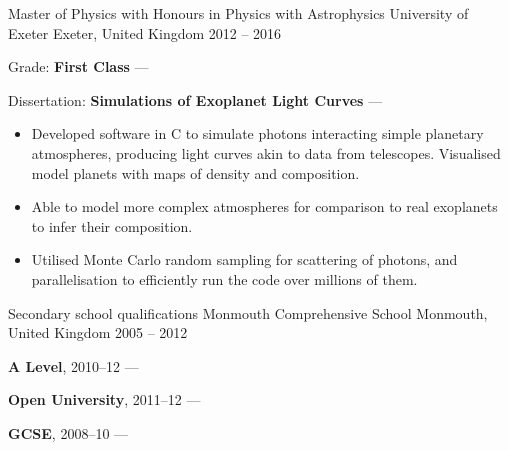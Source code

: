 \begin{cventries}
    \cventry
        {Master of Physics with Honours in Physics with Astrophysics}
        {University of Exeter}
        {Exeter, United Kingdom}
        {2012 -- 2016}
        {
        \begin{cvitems} %
            \item {Grade: \textbf{First Class} --- }
            \item {Dissertation: \textbf{Simulations of Exoplanet Light Curves} --- }
            \vpaddingEduSubpoint
            \begin{itemize}[itemsep=\vPaddingLength, label=\bullet]
                \item{Developed software in C to simulate photons interacting simple planetary atmospheres, producing light curves akin to data from telescopes. Visualised model planets with maps of density and composition.}
                \item{Able to model more complex atmospheres for comparison to real exoplanets to infer their composition.}
                \item{Utilised Monte Carlo random sampling for scattering of photons, and parallelisation to efficiently run the code over millions of them.}
            \end{itemize}
        \end{cvitems}
        } %

    \cventry
        {Secondary school qualifications}
        {Monmouth Comprehensive School}
        {Monmouth, United Kingdom}
        {2005 -- 2012}
        {
        \begin{cvitems}
            \item {\textbf{A Level}, 2010--12 --- }
            \item {\textbf{Open University}, 2011--12 --- }
            \item {\textbf{GCSE}, 2008--10 --- }
        \end{cvitems}
        }
\end{cventries}
